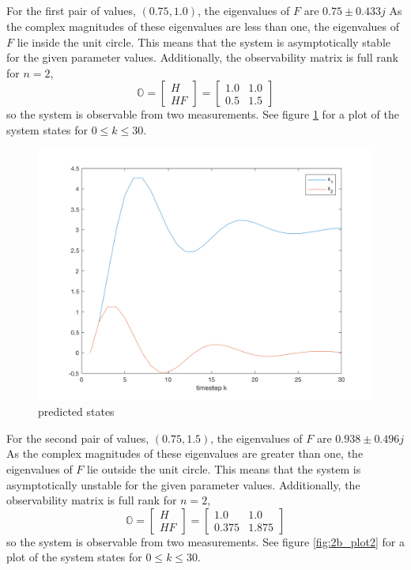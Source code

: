 \documentclass[11pt]{article}
\begin{document}
\subparagraph*{}
For the first pair of values, $(0.75,1.0)$, the eigenvalues of $F$ are $0.75\pm0.433j$ As the complex magnitudes of these eigenvalues are less than one, the eigenvalues of $F$ lie inside the unit circle. This means that the system is asymptotically stable for the given parameter values. Additionally, the observability matrix is full rank for $n=2$, 
\begin{equation*}
	\mathbb{O} = \begin{bmatrix} H \\ HF \end{bmatrix} = \begin{bmatrix} 1.0 & 1.0 \\ 0.5 & 1.5 \end{bmatrix}
\end{equation*}
so the system is observable from two measurements. See figure \ref{fig:2b_plot1} for a plot of the system states for $0\leq k\leq 30$.

\begin{figure}[h!]
	\centering
	\includegraphics[width=0.6\linewidth]{2b_plot1.png}
	\caption{predicted states}
	\label{fig:2b_plot1}
\end{figure}

For the second pair of values, $(0.75,1.5)$, the eigenvalues of $F$ are $0.938\pm0.496j$ As the complex magnitudes of these eigenvalues are greater than one, the eigenvalues of $F$ lie outside the unit circle. This means that the system is asymptotically unstable for the given parameter values. Additionally, the observability matrix is full rank for $n=2$, 
\begin{equation*}
	\mathbb{O} = \begin{bmatrix} H \\ HF \end{bmatrix} = \begin{bmatrix} 1.0 & 1.0 \\ 0.375 & 1.875 \end{bmatrix}
\end{equation*}
so the system is observable from two measurements. See figure \ref{fig:2b_plot2} for a plot of the system states for $0\leq k\leq 30$.
\end{document}
